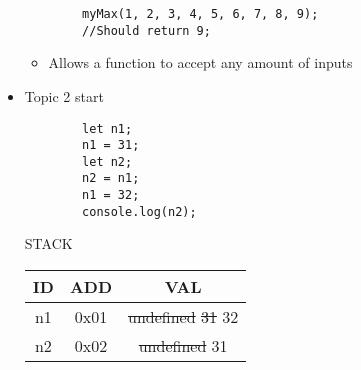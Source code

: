 \documentclass{article}
\begin{document}
\begin{itemize}
\begin{lstlisting}
        myMax(1, 2, 3, 4, 5, 6, 7, 8, 9);
        //Should return 9;
    \end{lstlisting}
    \begin{itemize}
        \item Allows a function to accept any amount of inputs
    \end{itemize}
    \item Topic 2 start
    \begin{lstlisting}
        let n1;
        n1 = 31;
        let n2;
        n2 = n1;
        n1 = 32;
        console.log(n2);
    \end{lstlisting}
    \begin{center}
        STACK
    \begin{tabular}{|c|c|c|}
        \hline ID & ADD & VAL  \\
        \hline\hline
        n1 & 0x01 & \st{undefined} \st{31} 32 \\
        n2 & 0x02 & \st{undefined} 31 \\
        \hline    
    \end{tabular}
    \end{center}
\end{itemize}
\end{document}
